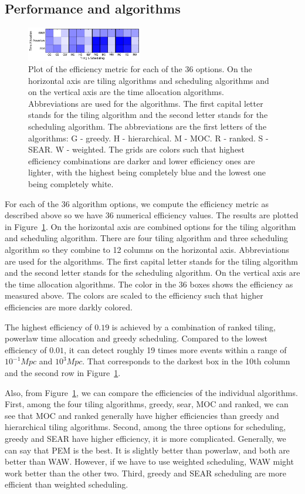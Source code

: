 \documentclass[twocolumn]{aastex61}
\begin{document}
\subsection{Performance and algorithms}
\begin{figure}[t]
\includegraphics[width=0.45\textwidth]{plots/efficiency.png}
\caption{Plot of the efficiency metric for each of the 36 options. On the horizontal axis are tiling algorithms and scheduling algorithms and on the vertical axis are the time allocation algorithms. Abbreviations are used for the algorithms. The first capital letter stands for the tiling algorithm and the second letter stands for the scheduling algorithm. The abbreviations are the first letters of the algorithms: G - greedy. H - hierarchical. M - MOC. R - ranked. S - SEAR. W - weighted. The grids are colors such that highest efficiency combinations are darker and lower efficiency ones are lighter, with the highest being completely blue and the lowest one being completely white.}
\label{fig:eff_metric}
\centering
\end{figure}
For each of the 36 algorithm options, we compute the efficiency metric as described above so we have 36 numerical efficiency values. The results are plotted in Figure~\ref{fig:eff_metric}. On the horizontal axis are combined options for the tiling algorithm and scheduling algorithm. There are four tiling algorithm and three scheduling algorithm so they combine to 12 columns on the horizontal axis. Abbreviations are used for the algorithms. The first capital letter stands for the tiling algorithm and the second letter stands for the scheduling algorithm. On the vertical axis are the time allocation algorithms. The color in the 36 boxes shows the efficiency as measured above. The colors are scaled to the efficiency such that higher efficiencies are more darkly colored.

The highest efficiency of $0.19$ is achieved by a combination of ranked tiling, powerlaw time allocation and greedy scheduling. Compared to the lowest efficiency of $0.01$, it can detect roughly 19 times more events within a range of $10^{-1} Mpc$ and $10^3 Mpc$. That corresponds to the darkest box in the 10th column and the second row in Figure~\ref{fig:eff_metric}. 

Also, from Figure~\ref{fig:eff_metric}, we can compare the efficiencies of the individual algorithms. First, among the four tiling algorithms, greedy, sear, MOC and ranked, we can see that MOC and ranked generally have higher efficiencies than greedy and hierarchical tiling algorithms. Second, among the three options for scheduling, greedy and SEAR have higher efficiency, it is more complicated. Generally, we can say that PEM is the best. It is slightly better than powerlaw, and both are better than WAW. However, if we have to use weighted scheduling, WAW might work better than the other two. Third, greedy and SEAR scheduling are more efficient than weighted scheduling.
\end{document}

